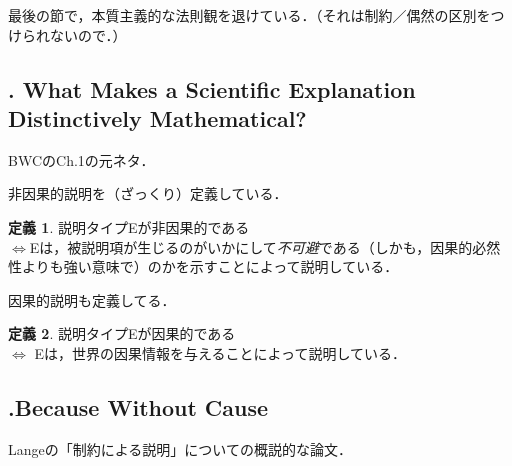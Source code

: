 \documentclass[twoside,14Q,dvipdfmx,uplatex]{jsarticle}
\theoremstyle{definition}
\newtheorem{dfn}{定義}
\begin{document}
最後の節で，本質主義的な法則観を退けている．（それは制約／偶然の区別をつけられないので．）

\subsection{\cite{Lange2013a}. What Makes a Scientific Explanation Distinctively Mathematical?}
BWCのCh.1の元ネタ．

非因果的説明を（ざっくり）定義している\citep[487,491]{Lange2013a}．
\begin{dfn}
    説明タイプEが非因果的である\\
    $\Longleftrightarrow$Eは，被説明項が生じるのがいかにして\emph{不可避}である（しかも，因果的必然性よりも強い意味で）のかを示すことによって説明している．
\end{dfn}
因果的説明も定義してる\citep[493]{Lange2013a}．
\begin{dfn}
    説明タイプEが因果的である\\
    $\Longleftrightarrow$ Eは，世界の因果情報を与えることによって説明している．
\end{dfn}


\subsection{\cite{Lange2018b}.Because Without Cause}
Langeの「制約による説明」についての概説的な論文．



\end{document}
